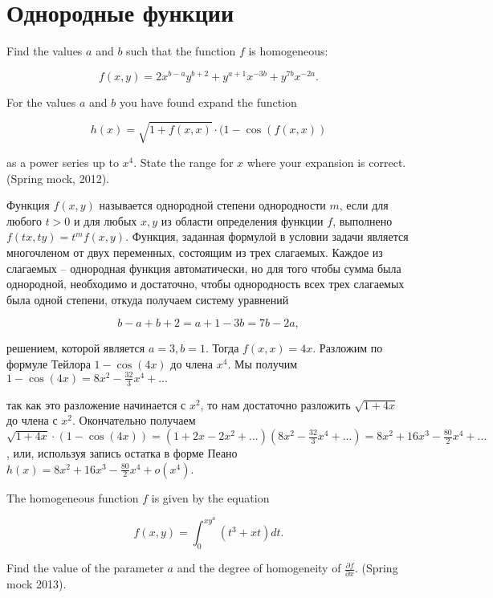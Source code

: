 

\section{Однородные функции}

\begin{problem}
Find the values $a$ and $b$ such that the function $f$ is homogeneous:

\[f(x,y)=2x^{b-a} y^{b+2} +y^{a+1} x^{-3b} +y^{7b} x^{-2a} .\] 

For the values $a$ and $b$ you have found expand the function

\[h(x)=\sqrt{1+f(x,x)} \cdot (1-\cos (f(x,x))\] 

as a power series up to $x^{4} $. State the range for $x$ where your expansion is correct. (Spring mock, 2012).
\end{problem}


\begin{solution}
Функция $f(x,y)$ называется однородной степени однородности $m$, если для любого $t>0$ и для любых $x,y$ из области определения функции $f$, выполнено $f(tx,ty)=t^{m} f(x,y)$. Функция, заданная формулой в условии задачи является многочленом от двух переменных, состоящим из трех слагаемых. Каждое из слагаемых -- однородная функция автоматически, но для того чтобы сумма была однородной, необходимо и достаточно, чтобы однородность всех трех слагаемых была одной степени, откуда получаем систему уравнений 

\[b-a+b+2=a+1-3b=7b-2a,\] 

решением, которой является $a=3,  b=1$. Тогда $f(x,x)=4x$. Разложим по формуле Тейлора $1-\cos (4x)$ до члена $x^{4} $. Мы получим $1-\cos (4x)=8x^{2} -\frac{32}{3} x^{4} +...$

так как это разложение начинается с $x^{2} $, то нам достаточно разложить $\sqrt{1+4x} $ до члена с $x^{2} $. Окончательно получаем $\sqrt{1+4x} \cdot (1-\cos (4x))=(1+2x-2x^{2} +...)(8x^{2} -\frac{32}{3} x^{4} +...)=8x^{2} +16x^{3} -\frac{80}{2} x^{4} +...$, или, используя запись остатка в форме Пеано $h(x)=8x^{2} +16x^{3} -\frac{80}{2} x^{4} +o(x^{4} )$.
\end{solution}


\begin{problem}
The homogeneous function $f$ is given by the equation

\[f(x,y)=\int _{0}^{xy^{a} }(t^{3} +xt)dt .\] 


Find the value of the parameter $a$ and the degree of homogeneity of $\frac{\partial f}{\partial x} $. (Spring mock 2013).
\end{problem}


